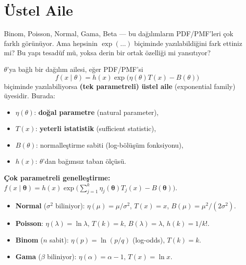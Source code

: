 \section{Üstel Aile}
\label{sec:ustel_aile}

\begin{kesif}
Binom, Poisson, Normal, Gama, Beta --- bu dağılımların PDF/PMF'leri çok farklı görünüyor.
Ama hepsinin $\exp(\ldots)$ biçiminde yazılabildiğini fark ettiniz mi?
Bu yapı tesadüf mü, yoksa derin bir ortak özelliği mi yansıtıyor?
\end{kesif}

\begin{tanim}
\label{def:ustel_aile}
$\theta$'ya bağlı bir dağılım ailesi, eğer PDF/PMF'si
\[
  f(x \mid \theta) = h(x) \exp\!\bigl(\eta(\theta) T(x) - B(\theta)\bigr)
\]
biçiminde yazılabiliyorsa \textbf{(tek parametreli) üstel aile} (exponential family) üyesidir.
Burada:
\begin{itemize}
  \item $\eta(\theta)$: \textbf{doğal parametre} (natural parameter),
  \item $T(x)$: \textbf{yeterli istatistik} (sufficient statistic),
  \item $B(\theta)$: normalleştirme sabiti (log-bölüşüm fonksiyonu),
  \item $h(x)$: $\theta$'dan bağımsız taban ölçüsü.
\end{itemize}
\textbf{Çok parametreli genelleştirme:}
$f(x \mid \boldsymbol{\theta}) = h(x) \exp\!\bigl(\sum_{j=1}^k \eta_j(\boldsymbol{\theta}) T_j(x) - B(\boldsymbol{\theta})\bigr)$.
\end{tanim}

\begin{ornek}
\begin{itemize}
  \item \textbf{Normal} ($\sigma^2$ biliniyor): $\eta(\mu) = \mu/\sigma^2$, $T(x) = x$, $B(\mu) = \mu^2/(2\sigma^2)$.
  \item \textbf{Poisson}: $\eta(\lambda) = \ln\lambda$, $T(k) = k$, $B(\lambda) = \lambda$, $h(k) = 1/k!$.
  \item \textbf{Binom} ($n$ sabit): $\eta(p) = \ln(p/q)$ (log-odds), $T(k) = k$.
  \item \textbf{Gama} ($\beta$ biliniyor): $\eta(\alpha) = \alpha-1$, $T(x) = \ln x$.
\end{itemize}
\end{ornek}

